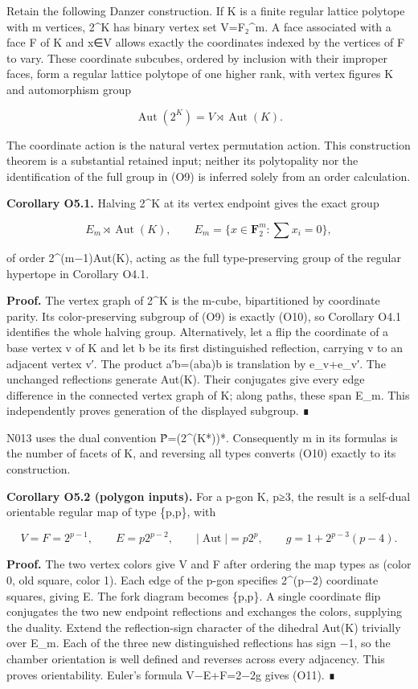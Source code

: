 \documentclass[
  10pt,
  letterpaper,
]{article}
\begin{document}
Retain the following Danzer construction. If K is a finite regular
lattice polytope with m vertices, 2\^{}K has binary vertex set
V=F₂\^{}m. A face associated with a face F of K and x∈V allows exactly
the coordinates indexed by the vertices of F to vary. These coordinate
subcubes, ordered by inclusion with their improper faces, form a regular
lattice polytope of one higher rank, with vertex figures K and
automorphism group

\[
\operatorname{Aut}(2^K)=V\rtimes\operatorname{Aut}(K).
\tag{O9}
\]

The coordinate action is the natural vertex permutation action. This
construction theorem is a substantial retained input; neither its
polytopality nor the identification of the full group in (O9) is
inferred solely from an order calculation.

\textbf{Corollary O5.1.} Halving 2\^{}K at its vertex endpoint gives the
exact group

\[
E_m\rtimes\operatorname{Aut}(K),\qquad
E_m=\{x\in\mathbf F_2^m:\sum x_i=0\},
\tag{O10}
\]

of order 2\^{}(m−1)\textbar Aut(K)\textbar, acting as the full
type-preserving group of the regular hypertope in Corollary O4.1.

\textbf{Proof.} The vertex graph of 2\^{}K is the m-cube, bipartitioned
by coordinate parity. Its color-preserving subgroup of (O9) is exactly
(O10), so Corollary O4.1 identifies the whole halving group.
Alternatively, let a flip the coordinate of a base vertex v of K and let
b be its first distinguished reflection, carrying v to an adjacent
vertex v′. The product a′b=(aba)b is translation by e\_v+e\_v′. The
unchanged reflections generate Aut(K). Their conjugates give every edge
difference in the connected vertex graph of K; along paths, these span
E\_m. This independently proves generation of the displayed subgroup. ∎

N013 uses the dual convention P̂=(2\^{}(K*))*. Consequently m in its
formulas is the number of facets of K, and reversing all types converts
(O10) exactly to its construction.

\textbf{Corollary O5.2 (polygon inputs).} For a p-gon K, p≥3, the result
is a self-dual orientable regular map of type \{p,p\}, with

\[
V=F=2^{p-1},\qquad E=p2^{p-2},\qquad
|\operatorname{Aut}|=p2^p,\qquad
g=1+2^{p-3}(p-4).
\tag{O11}
\]

\textbf{Proof.} The two vertex colors give V and F after ordering the
map types as (color 0, old square, color 1). Each edge of the p-gon
specifies 2\^{}(p−2) coordinate squares, giving E. The fork diagram
becomes \{p,p\}. A single coordinate flip conjugates the two new
endpoint reflections and exchanges the colors, supplying the duality.
Extend the reflection-sign character of the dihedral Aut(K) trivially
over E\_m. Each of the three new distinguished reflections has sign −1,
so the chamber orientation is well defined and reverses across every
adjacency. This proves orientability. Euler's formula V−E+F=2−2g gives
(O11). ∎
\end{document}
